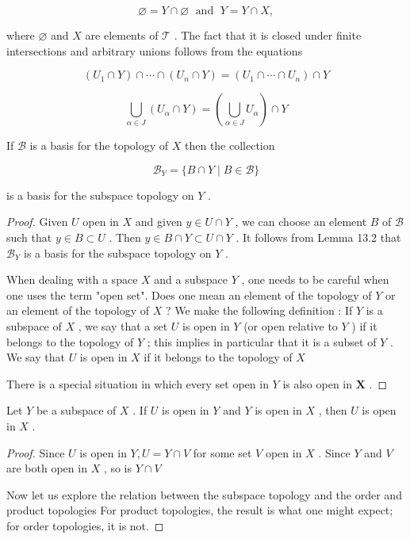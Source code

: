 \[
\varnothing  = Y \cap  \varnothing \;\text{ and }\;Y = Y \cap  X,
\]

where \(\varnothing\) and \(X\) are elements of \(\mathcal{T}\) . The fact that it is closed under finite intersections and arbitrary unions follows from the equations

\[
\left( {{U}_{1} \cap  Y}\right)  \cap  \cdots  \cap  \left( {{U}_{n} \cap  Y}\right)  = \left( {{U}_{1} \cap  \cdots  \cap  {U}_{n}}\right)  \cap  Y
\]

\[
\mathop{\bigcup }\limits_{{\alpha  \in  J}}\left( {{U}_{\alpha } \cap  Y}\right)  = \left( {\mathop{\bigcup }\limits_{{\alpha  \in  J}}{U}_{\alpha }}\right)  \cap  Y
\]

\begin{lemma} If \(\mathcal{B}\) is a basis for the topology of \(X\) then the collection

\[
{\mathcal{B}}_{Y} = \{ B \cap  Y \mid  B \in  \mathcal{B}\}
\]

is a basis for the subspace topology on \(Y\) .
\end{lemma}

\begin{proof}
Given \(U\) open in \(X\) and given \(y \in  U \cap  Y\) , we can choose an element \(B\) of \(\mathcal{B}\) such that \(y \in  B \subset  U\) . Then \(y \in  B \cap  Y \subset  U \cap  Y\) . It follows from Lemma 13.2 that \({\mathcal{B}}_{Y}\) is a basis for the subspace topology on \(Y\) .

When dealing with a space \(X\) and a subspace \(Y\) , one needs to be careful when one uses the term "open set". Does one mean an element of the topology of \(Y\) or an element of the topology of \(X\) ? We make the following definition : If \(Y\) is a subspace of \(X\) , we say that a set \(U\) is open in \(Y\) (or open relative to \(Y\) ) if it belongs to the topology of \(Y\) ; this implies in particular that it is a subset of \(Y\) . We say that \(U\) is open in \(X\) if it belongs to the topology of \(X\)

There is a special situation in which every set open in \(Y\) is also open in \(\mathbf{X}\) .
\end{proof}

\begin{lemma} Let \(Y\) be a subspace of \(X\) . If \(U\) is open in \(Y\) and \(Y\) is open in \(X\) , then \(U\) is open in \(X\) .
\end{lemma}

\begin{proof}
Since \(U\) is open in \(Y,U = Y \cap  V\) for some set \(V\) open in \(X\) . Since \(Y\) and \(V\) are both open in \(X\) , so is \(Y \cap  V\)

Now let us explore the relation between the subspace topology and the order and product topologies For product topologies, the result is what one might expect; for order topologies, it is not.
\end{proof}

